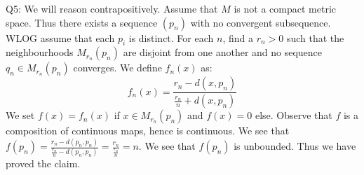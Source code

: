\documentclass[letterpaper]{article}
\begin{document}
\noindent Q5: We will reason contrapositively. Assume that $M$ is not a compact metric space. Thus there exists a sequence $(p_n)$ with no convergent subsequence. WLOG assume that each $p_i$ is distinct.
For each $n$, find a $r_n>0$ such that the neighbourhoods $M_{r_n}(p_n)$ are disjoint from one another and no sequence $q_n\in M_{r_n}(p_n)$ converges. We define $f_n(x)$ as: 
$$f_n(x) = \frac{r_n-d(x,p_n)}{\frac{r_n}{n} + d(x,p_n)}$$
We set $f(x)=f_n(x)$ if $x\in M_{r_n}(p_n)$ and $f(x)=0$ else. Observe that $f$ is a composition of continuous maps, hence is continuous. We see that $f(p_n) = \frac{r_n-d(p_n,p_n)}{\frac{r_n}{n}-d(p_n,p_n)} = \frac{r_n}{\frac{r_n}{n}} = n$. We see that $f(p_n)$ is unbounded. Thus we have proved the claim.  
\end{document}
